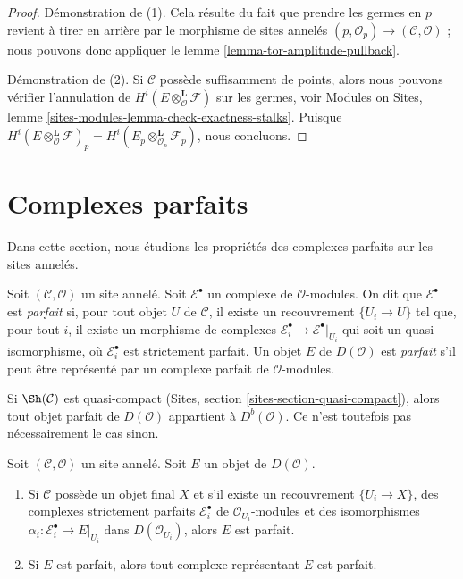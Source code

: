 \begin{proof}
Démonstration de (1). Cela résulte du fait que prendre les germes en $p$
revient à tirer en arrière par le morphisme de sites annelés
$(p, \mathcal{O}_p) \to (\mathcal{C}, \mathcal{O})$ ; nous pouvons donc
appliquer le lemme \ref{lemma-tor-amplitude-pullback}.

\medskip\noindent
Démonstration de (2). Si $\mathcal{C}$ possède suffisamment de points, alors
nous pouvons vérifier l'annulation de
$H^i(E \otimes_\mathcal{O}^\mathbf{L} \mathcal{F})$
sur les germes, voir Modules on Sites, lemme
\ref{sites-modules-lemma-check-exactness-stalks}. Puisque
$H^i(E \otimes_\mathcal{O}^\mathbf{L} \mathcal{F})_p =
H^i(E_p \otimes_{\mathcal{O}_p}^\mathbf{L} \mathcal{F}_p)$, nous concluons.
\end{proof}










\section{Complexes parfaits}
\label{section-perfect}

\noindent
Dans cette section, nous étudions les propriétés des complexes parfaits sur
les sites annelés.

\begin{definition}
\label{definition-perfect}
Soit $(\mathcal{C}, \mathcal{O})$ un site annelé. Soit
$\mathcal{E}^\bullet$ un complexe de $\mathcal{O}$-modules. On dit que
$\mathcal{E}^\bullet$ est {\it parfait} si, pour tout objet $U$ de
$\mathcal{C}$, il existe un recouvrement $\{U_i \to U\}$ tel que, pour tout
$i$, il existe un morphisme de complexes
$\mathcal{E}_i^\bullet \to \mathcal{E}^\bullet|_{U_i}$
qui soit un quasi-isomorphisme, où $\mathcal{E}_i^\bullet$ est strictement
parfait. Un objet $E$ de $D(\mathcal{O})$ est {\it parfait} s'il peut être
représenté par un complexe parfait de $\mathcal{O}$-modules.
\end{definition}

\noindent
Si $\Sh(\mathcal{C})$ est quasi-compact (Sites, section
\ref{sites-section-quasi-compact}), alors tout objet parfait de
$D(\mathcal{O})$ appartient à $D^b(\mathcal{O})$. Ce n'est toutefois pas
nécessairement le cas sinon.

\begin{lemma}
\label{lemma-perfect-independent-representative}
Soit $(\mathcal{C}, \mathcal{O})$ un site annelé.
Soit $E$ un objet de $D(\mathcal{O})$.
\begin{enumerate}
\item Si $\mathcal{C}$ possède un objet final $X$ et s'il existe un
recouvrement $\{U_i \to X\}$, des complexes strictement parfaits
$\mathcal{E}_i^\bullet$ de $\mathcal{O}_{U_i}$-modules et des isomorphismes
 $\alpha_i : \mathcal{E}_i^\bullet \to E|_{U_i}$ dans
$D(\mathcal{O}_{U_i})$, alors $E$ est parfait.
\item Si $E$ est parfait, alors tout complexe représentant $E$ est parfait.
\end{enumerate}
\end{lemma}

